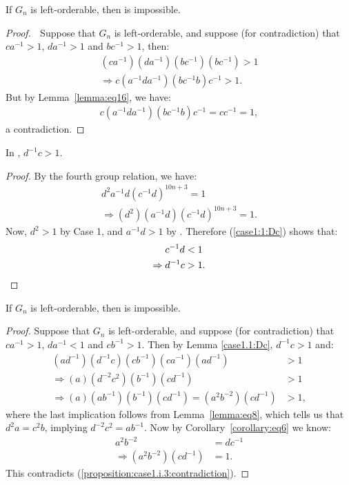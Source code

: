 \begin{proposition} If $G_n$ is left-orderable, then  is impossible.
\end{proposition}
\begin{proof} $\;$ Suppose that $G_n$ is left-orderable, and suppose (for contradiction) that $ca^{-1}>1$, $da^{-1}>1$ and $bc^{-1}>1$, then: 
\begin{align*}
(ca^{-1})(da^{-1})(bc^{-1})(bc^{-1})>1\\
\Rightarrow{}c(a^{-1}da^{-1})(bc^{-1}b)c^{-1}>1.
\end{align*}
But by Lemma~\ref{lemma:eq16}, we have:
\begin{align*}
c(a^{-1}da^{-1})(bc^{-1}b)c^{-1}=cc^{-1}=1,
\end{align*}
a contradiction.
\end{proof}

\begin{lemma} In , $d^{-1}c>1$.\label{case1.1:Dc}
\end{lemma}
\begin{proof} By the fourth group relation, we have:
\begin{align}
d^{2}a^{-1}d(c^{-1}d)^{10n+3}=1\nonumber{}\\
\Rightarrow{}(d^{2})(a^{-1}d)(c^{-1}d)^{10n+3}=1.\label{case1:1:Dc}
\end{align}
Now, $d^{2}>1$ by Case 1, and $a^{-1}d>1$ by . Therefore (\ref{case1:1:Dc}) shows that:
\begin{align*}
c^{-1}d&<1\\
\Rightarrow{}d^{-1}c&>1.\qedhere
\end{align*}
\end{proof}

\begin{proposition} If $G_n$ is left-orderable, then  is impossible.
\end{proposition}
\begin{proof} Suppose that $G_n$ is left-orderable, and suppose (for contradiction) that $ca^{-1}>1$, $da^{-1}<1$ and $cb^{-1}>1$. Then by Lemma \ref{case1.1:Dc}, $d^{-1}c>1$ and:
\begin{align}
(ad^{-1})(d^{-1}c)(cb^{-1})(ca^{-1})(ad^{-1})&>1\nonumber{}\\
\Rightarrow{}(a)(d^{-2}c^{2})(b^{-1})(cd^{-1})&>1\nonumber{}\\
\Rightarrow{}(a)(ab^{-1})(b^{-1})(cd^{-1})=(a^{2}b^{-2})(cd^{-1})&>1,\label{proposition:case1.i.3:contradiction}
\end{align}
where the last implication follows from Lemma~\ref{lemma:eq8}, which tells us that $d^{2}a=c^{2}b$, implying $d^{-2}c^{2}=ab^{-1}$. Now by Corollary~\ref{corollary:eq6} we know:
\begin{align*}
a^{2}b^{-2}&=dc^{-1}\\
\Rightarrow{}(a^{2}b^{-2})(cd^{-1})&=1.
\end{align*}
This contradicts (\ref{proposition:case1.i.3:contradiction}).
\end{proof}


